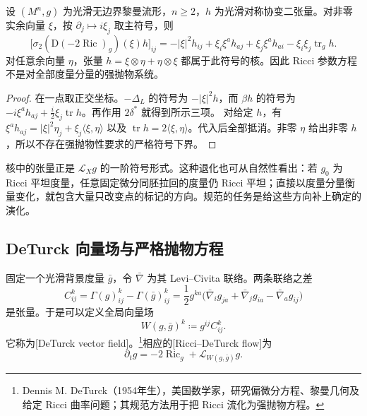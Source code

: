 \begin{proposition}\label{g3:prop:ricci-flow-symbol-degeneracy}
	设 \((M^n,g)\) 为光滑无边界黎曼流形，\(n\ge2\)，\(h\) 为光滑对称协变二张量。对非零实余向量 \(\xi\)，按 \(\partial_j\mapsto i\xi_j\) 取主符号，则
	\begin{equation}\label{g3:eq:ricci-flow-degenerate-symbol}
		\bigl[\sigma_2(\mathrm D(-2\operatorname{Ric})_g)(\xi)h\bigr]_{ij}
		=-|\xi|^2h_{ij}+\xi_i\xi^ah_{aj}+\xi_j\xi^ah_{ai}
		-\xi_i\xi_j\operatorname{tr}_gh.
	\end{equation}
	对任意余向量 \(\eta\)，张量 \(h=\xi\otimes\eta+\eta\otimes\xi\) 都属于此符号的核。因此 Ricci 参数方程不是对全部度量分量的强抛物系统。
\end{proposition}
\begin{proof}
	在一点取正交坐标。\(-\Delta_L\) 的符号为 \(-|\xi|^2h\)，而 \(\beta h\) 的符号为 \(-i\xi^ah_{aj}+\tfrac i2\xi_j\operatorname{tr}h\)。再作用 \(2\delta^*\) 就得到所示三项。
	对给定 \(h\)，有 \(\xi^ah_{aj}=|\xi|^2\eta_j+\xi_j\langle\xi,\eta\rangle\) 以及 \(\operatorname{tr}h=2\langle\xi,\eta\rangle\)。代入后全部抵消。非零 \(\eta\) 给出非零 \(h\)，所以不存在强抛物性要求的严格符号下界。
\end{proof}

核中的张量正是 \(\mathcal L_Xg\) 的一阶符号形式。这种退化也可从自然性看出：若 \(g_0\) 为 Ricci 平坦度量，任意固定微分同胚拉回的度量仍 Ricci 平坦；直接以度量分量衡量变化，就包含大量只改变点的标记的方向。规范的任务是给这些方向补上确定的演化。

\subsection{DeTurck 向量场与严格抛物方程}
\label{g3:subsec:2701:03}
固定一个光滑背景度量 \(\bar g\)，令 \(\bar\nabla\) 为其 Levi--Civita 联络。两条联络之差
\[
	C^k_{ij}=\Gamma(g)^k_{ij}-\Gamma(\bar g)^k_{ij}
	=\frac12g^{ka}\bigl(\bar\nabla_i g_{ja}+\bar\nabla_j g_{ia}-\bar\nabla_a g_{ij}\bigr)
\]
是张量。于是可以定义全局向量场
\begin{equation}\label{g3:eq:deturck-vector-field}
	W(g,\bar g)^k\coloneqq g^{ij}C^k_{ij}.
\end{equation}
它称为[DeTurck vector field]。\footnote{Dennis M. DeTurck（1954年生），美国数学家，研究偏微分方程、黎曼几何及给定 Ricci 曲率问题；其规范方法用于把 Ricci 流化为强抛物方程。}相应的[Ricci--DeTurck flow]为
\begin{equation}\label{g3:eq:ricci-deturck-flow}
	\partial_tg=-2\operatorname{Ric}_g+\mathcal L_{W(g,\bar g)}g.
\end{equation}

